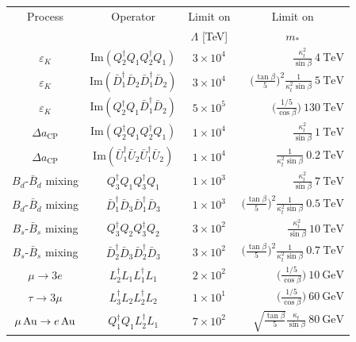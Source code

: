 \documentclass[a4paper,12pt]{article}
\def\mst{m_*}
\begin{document}
\renewcommand{\arraystretch}{1.5}
\begin{table}[t]
\centering
\begin{tabular}{|c|c|c|r|}
\hline
Process & Operator & Limit on & \multicolumn{1}{|c|}{Limit on} \\
 & & $\Lambda$ [TeV] & \multicolumn{1}{|c|}{$\mst$}  \\
 \hline
 $\varepsilon_K$ & ${\text{Im}}(Q_2^\dagger Q_1Q_2^\dagger Q_1)$ & $3 \times 10^4$ & $ \frac{\kappa_t^2} {\sin\beta}~ 4~\text{TeV}$\\
 $\varepsilon_K$ & ${\text{Im}}(\bar D_1^{\dagger}\bar D_2\bar D_1^{\dagger}\bar D_2)$ & $3 \times 10^4$ & $\big(\frac{\tan \beta}{5}\big)^2\frac{1}{\kappa_t^2 \sin\beta}~ 5~\text{TeV}$\\
 $\varepsilon_K$ & ${\text{Im}}(Q_2^\dagger Q_1\bar D_1^{\dagger}\bar D_2)$ & $5 \times 10^5$ & $\big(\frac{1/5}{\cos\beta}\big)~ 130~\text{TeV}$\\
 $\Delta a_{\text{CP}}$ & ${\text{Im}}(Q_2^\dagger Q_1Q_2^\dagger Q_1)$ & $1 \times 10^4$ & $ \frac{\kappa_t^2} {\sin\beta}~ 1~\text{TeV}$\\
 $\Delta a_{\text{CP}}$ & ${\text{Im}}(\bar U_1^{\dagger}\bar U_2\bar U_1^{\dagger}\bar U_2)$ & $1 \times 10^4$ & $ \frac{1}{\kappa_t^2\sin\beta}~ 0.2~\text{TeV}$\\
 $B_d$-${\bar B}_d$ mixing & $Q_3^\dagger Q_1Q_3^\dagger Q_1$ & $1 \times 10^3$ & $ \frac{\kappa_t^2} {\sin\beta}~ 7~\text{TeV}$\\
 $B_d$-${\bar B}_d$ mixing & $\bar D_1^{\dagger}\bar D_3 \bar D_1^{\dagger}\bar D_3$ & $1 \times 10^3$ & $\big(\frac{\tan \beta}{5}\big)^2\frac{1}{\kappa_t^2 \sin\beta}~ 0.5~\text{TeV}$\\
 $B_s$-${\bar B}_s$ mixing & $Q_3^\dagger Q_2Q_3^\dagger Q_2$ & $3 \times 10^2$ & $ \frac{\kappa_t^2} {\sin\beta}~ 10~\text{TeV}$\\
 $B_s$-${\bar B}_s$ mixing & $\bar D_2^{\dagger}\bar D_3 \bar D_2^{\dagger}\bar D_3$ & $3 \times 10^2$ & $\big(\frac{\tan \beta}{5}\big)^2\frac{1}{\kappa_t^2 \sin\beta}~ 0.7~\text{TeV}$\\
 $\mu \to 3e$ & $L_2^\dagger L_1 L_1^\dagger L_1$ & $2 \times 10^2$ & $\big(\frac{1/5}{\cos\beta}\big)~ 10~\text{GeV}$\\
 $\tau \to 3\mu$ & $L_3^\dagger L_2 L_2^\dagger L_2$ & $1 \times 10^1$ & $\big(\frac{1/5}{\cos\beta}\big)~ 60~\text{GeV}$\\
  $\mu \,{\rm Au} \to e \,{\rm Au}$ & $Q_1^\dagger Q_1 L_2^\dagger L_1$ &$7 \times 10^2$&  $\sqrt{\frac{\tan \beta}{5}}\frac{\kappa_t}{ \sin\beta}~ 80~\text{GeV}$\\

\end{tabular}
\end{table}
\end{document}
